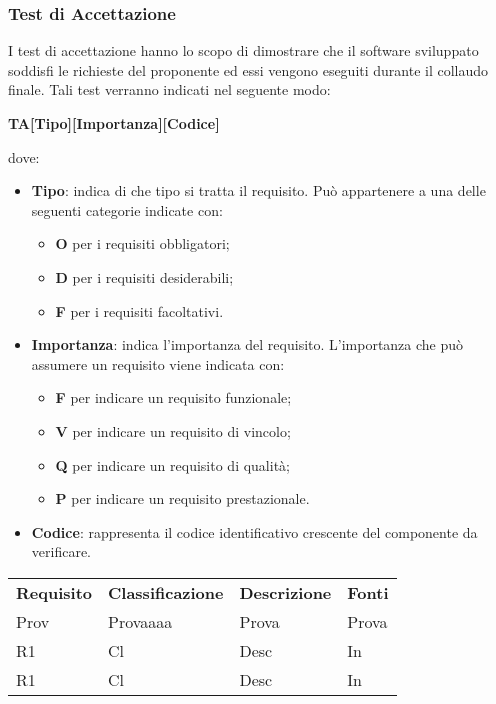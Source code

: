 \subsubsection{Test di Accettazione}
I test di accettazione hanno lo scopo di dimostrare che il software sviluppato 
soddisfi le richieste del proponente ed essi vengono eseguiti durante il
collaudo finale. Tali test verranno indicati nel seguente modo: \\
	\centerline{\textbf{TA[Tipo][Importanza][Codice]}}
dove:
\begin{itemize}
	\item \textbf{Tipo}: indica di che tipo si tratta il requisito. Può
		appartenere a una delle seguenti categorie indicate con:
		\begin{itemize}
			\item \textbf{O} per i requisiti obbligatori;
			\item \textbf{D} per i requisiti desiderabili;
			\item \textbf{F} per i requisiti facoltativi.			
		\end{itemize}
	\item \textbf{Importanza}: indica l'importanza del requisito. L'importanza
		che può assumere un requisito viene indicata con:
		\begin{itemize}
			\item \textbf{F} per indicare un requisito funzionale;
			\item \textbf{V} per indicare un requisito di vincolo;
			\item \textbf{Q} per indicare un requisito di qualità;
			\item \textbf{P} per indicare un requisito prestazionale. 
		\end{itemize}
	\item \textbf{Codice}: rappresenta il codice identificativo crescente
		del componente da verificare.
\end{itemize}


\begin{table}[H]
	\renewcommand{\arraystretch}{1.5}
	\caption{Riepilogo test di accettazione}	
	\begin{longtable}{ >{\centering}p{} >{\centering}p{}
			>{\centering}p{} >{\centering}p{}}
			
		\rowcolorhead
		\textbf{\color{white}Requisito} 
		& \textbf{\color{white}Classificazione} 
		& \centering\textbf{\color{white}Descrizione}
		& \textbf{\color{white}Fonti} 
		\tabularnewline %
		
		
		Prov & Provaaaa & Prova & Prova 
		
		\tabularnewline 
		R1 & Cl & Desc & In 
		
		\tabularnewline 
		R1 & Cl & Desc & In
	
	
	\end{longtable}
	

\end{table}


